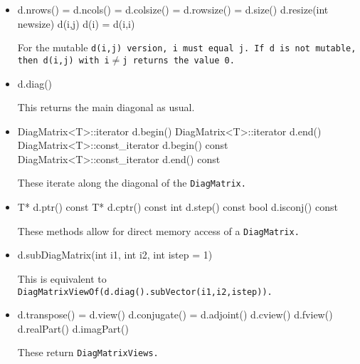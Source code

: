 \begin{itemize}

\item
\begin{tmvcode}
d.nrows() = d.ncols() = d.colsize() = d.rowsize() = d.size()
d.resize(int newsize)
d(i,j)
d(i) = d(i,i)
\end{tmvcode}
For the mutable \tt{d(i,j)} version, \tt{i} must equal \tt{j}.
If \tt{d} is not mutable, then \tt{d(i,j)} with \tt{i}$\neq$\tt{j} returns the 
value 0.

\item
\begin{tmvcode}
d.diag()
\end{tmvcode}
This returns the main diagonal as usual.

\item
\begin{tmvcode}
DiagMatrix<T>::iterator d.begin()
DiagMatrix<T>::iterator d.end()
DiagMatrix<T>::const_iterator d.begin() const
DiagMatrix<T>::const_iterator d.end() const
\end{tmvcode}
These iterate along the diagonal of the \tt{DiagMatrix}.

\item
\begin{tmvcode}
T* d.ptr()
const T* d.cptr() const
int d.step() const
bool d.isconj() const
\end{tmvcode}
These methods allow for direct memory access of a \tt{DiagMatrix}.

\item
\begin{tmvcode}
d.subDiagMatrix(int i1, int i2, int istep = 1)
\end{tmvcode}
This is equivalent to \tt{DiagMatrixViewOf(d.diag().subVector(i1,i2,istep))}.

\item
\begin{tmvcode}
d.transpose() = d.view()
d.conjugate() = d.adjoint()
d.cview()
d.fview()
d.realPart()
d.imagPart()
\end{tmvcode}
These return \tt{DiagMatrixView}s.

\end{itemize}

